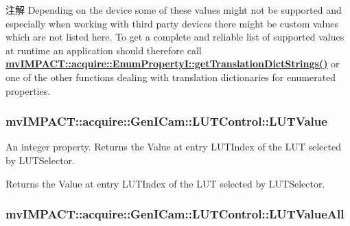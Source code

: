 \begin{DoxyNote}{注解}
Depending on the device some of these values might not be supported and especially when working with third party devices there might be custom values which are not listed here. To get a complete and reliable list of supported values at runtime an application should therefore call {\bfseries \hyperlink{classmv_i_m_p_a_c_t_1_1acquire_1_1_enum_property_i_a0ba6ccbf5ee69784d5d0b537924d26b6}{mv\+I\+M\+P\+A\+C\+T\+::acquire\+::\+Enum\+Property\+I\+::get\+Translation\+Dict\+Strings()}} or one of the other functions dealing with translation dictionaries for enumerated properties. 
\end{DoxyNote}
\hypertarget{classmv_i_m_p_a_c_t_1_1acquire_1_1_gen_i_cam_1_1_l_u_t_control_a8bd649d5ecfe16c0cf07c78901703c40}{
\subsubsection[{L\+U\+T\+Value}]{ mv\+I\+M\+P\+A\+C\+T\+::acquire\+::\+Gen\+I\+Cam\+::\+L\+U\+T\+Control\+::\+L\+U\+T\+Value}}\label{classmv_i_m_p_a_c_t_1_1acquire_1_1_gen_i_cam_1_1_l_u_t_control_a8bd649d5ecfe16c0cf07c78901703c40}


An integer property. Returns the Value at entry L\+U\+T\+Index of the L\+U\+T selected by L\+U\+T\+Selector. 

Returns the Value at entry L\+U\+T\+Index of the L\+U\+T selected by L\+U\+T\+Selector. \hypertarget{classmv_i_m_p_a_c_t_1_1acquire_1_1_gen_i_cam_1_1_l_u_t_control_ad8ec09121431e07567ddb3efb30230cb}{
\subsubsection[{L\+U\+T\+Value\+All}]{ mv\+I\+M\+P\+A\+C\+T\+::acquire\+::\+Gen\+I\+Cam\+::\+L\+U\+T\+Control\+::\+L\+U\+T\+Value\+All}}\label{classmv_i_m_p_a_c_t_1_1acquire_1_1_gen_i_cam_1_1_l_u_t_control_ad8ec09121431e07567ddb3efb30230cb}


